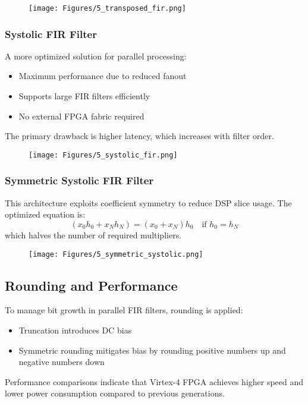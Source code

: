 \documentclass{article}
\begin{document}
	\begin{figure}
		\centering
		\texttt{[image: Figures/5\_transposed\_fir.png]}
		\label{fig:enter-label}
	\end{figure}
	
	\subsubsection{Systolic FIR Filter}
	A more optimized solution for parallel processing:
	\begin{itemize}
		\item Maximum performance due to reduced fanout
		\item Supports large FIR filters efficiently
		\item No external FPGA fabric required
	\end{itemize}
	The primary drawback is higher latency, which increases with filter order.
	
	\begin{figure}
		\centering
		\texttt{[image: Figures/5\_systolic\_fir.png]}
		\label{fig:enter-label}
	\end{figure}
	
	\subsubsection{Symmetric Systolic FIR Filter}
	This architecture exploits coefficient symmetry to reduce DSP slice usage. The optimized equation is:
	\begin{equation}
		(x_0 h_0 + x_N h_N) = (x_0 + x_N) h_0 \quad \text{if } h_0 = h_N
	\end{equation}
	which halves the number of required multipliers.
	
	\begin{figure}
		\centering
		\texttt{[image: Figures/5\_symmetric\_systolic.png]}
		\label{fig:enter-label}
	\end{figure}
	
	\subsection{Rounding and Performance}
	To manage bit growth in parallel FIR filters, rounding is applied:
	\begin{itemize}
		\item Truncation introduces DC bias
		\item Symmetric rounding mitigates bias by rounding positive numbers up and negative numbers down
	\end{itemize}
	Performance comparisons indicate that Virtex-4 FPGA achieves higher speed and lower power consumption compared to previous generations.
	
\end{document}
